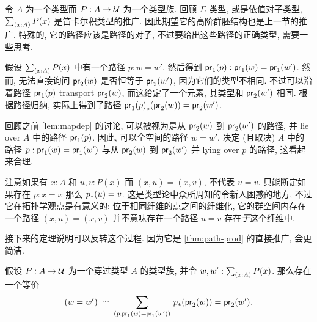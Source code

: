 %
令 $A$ 为一个类型而 $P:A\to\mathcal{U}$ 为一个类型族.
回顾 $\Sigma$-类型, 或是依值对子类型, $\sm{x:A} P(x)$ 是笛卡尔积类型的推广.
因此期望它的高阶群胚结构也是上一节的推广.
特殊的, 它的路径应该是路径的对子, 不过要给出这些路径的正确类型, 需要一些思考.

假设 $\sm{x:A}P(x)$ 中有一个路径 $p:w=w'$.
然后得到 ${\mathsf{pr}_{1}}\mathopen{}\left({p}\right)\mathclose{}:\mathsf{pr}_{1}(w)=\mathsf{pr}_{1}(w')$.
然而, 无法直接询问 $\mathsf{pr}_{2}(w)$ 是否恒等于 $\mathsf{pr}_{2}(w')$, 因为它们的类型不相同.
不过可以沿着路径 ${\mathsf{pr}_{1}}\mathopen{}\left({p}\right)\mathclose{}$ transport $\mathsf{pr}_{2}(w)$, 而这给定了一个元素, 其类型和 $\mathsf{pr}_{2}(w')$ 相同.
根据路径归纳, 实际上得到了路径 ${{\mathsf{pr}_{1}}\mathopen{}\left({p}\right)\mathclose{}}_{*}\mathopen{}\left({\mathsf{pr}_{2}(w)}\right)\mathclose{}=\mathsf{pr}_{2}(w')$.

回顾之前 \cref{lem:mapdep} 的讨论,
可以被视为是从 $\mathsf{pr}_{2}(w)$ 到 $\mathsf{pr}_{2}(w')$ 的路径, 并 lie over $A$ 中的路径 ${\mathsf{pr}_{1}}\mathopen{}\left({p}\right)\mathclose{}$.
%
%
因此, 可以全空间的路径 $w=w'$, 决定 (且取决) $A$ 中的路径 $p:\mathsf{pr}_{1}(w)=\mathsf{pr}_{1}(w')$ 与从 $\mathsf{pr}_{2}(w)$ 到 $\mathsf{pr}_{2}(w')$ 并 lying over $p$ 的路径, 这看起来合理.

\begin{rmk}
    注意如果有 $x:A$ 和 $u,v:P(x)$ 而 $(x,u)=(x,v)$, 不代表 $u=v$.
    只能断定如果存在 $p:x=x$ 那么 ${p}_{*}\mathopen{}\left({u}\right)\mathclose{} = v$.
    这是类型论中众所周知的令新人困惑的地方, 不过它在拓扑学观点是有意义的:
    位于相同纤维的点之间的纤维化, 它的群空间内存在一个路径 $(x,u)=(x,v)$ 并不意味存在一个路径 $u=v$ 存在\emph{于}这个纤维中.
\end{rmk}

接下来的定理说明可以反转这个过程.
因为它是 \cref{thm:path-prod} 的直接推广, 会更简洁.

\begin{thm}
    \label{thm:path-sigma}
    假设 $P:A\to\mathcal{U}$ 为一个穿过类型 $A$ 的类型族, 并令 $w,w':\sm{x:A}P(x)$. 那么存在一个等价
    \begin{equation*}
        \eqvspaced{(w=w')}{\dsm{p:\proj{1}(w)=\proj{1}(w')} \trans{p}{\proj{2}(w)}=\proj{2}(w')}.
    \end{equation*}
\end{thm}

